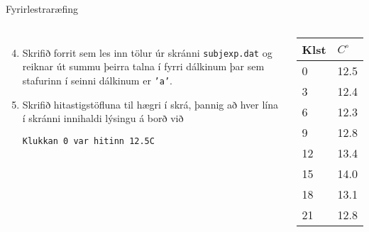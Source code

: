 \documentclass{beamer}
\begin{document}
\begin{frame}[fragile]{Fyrirlestraræfing}
\begin{columns}
\begin{enumerate}
 \setcounter{enumi}{3}
 \item Skrifið forrit sem les inn tölur úr skránni \texttt{subjexp.dat} og reiknar út summu þeirra talna í fyrri dálkinum þar sem stafurinn í seinni dálkinum er \texttt{'a'}.
 \item Skrifið hitastigstöfluna til hægri í skrá, þannig að hver lína í skránni innihaldi lýsingu á borð við
\begin{verbatim}
Klukkan 0 var hitinn 12.5C
\end{verbatim}
\end{enumerate}
\begin{center}
\begin{tabular}{ll}
\toprule
Klst&$C^\circ$\\
\midrule
0&12.5\\
3&12.4\\
6&12.3\\
9&12.8\\
12&13.4\\
15&14.0\\
18&13.1\\
21&12.8\\
\bottomrule
\end{tabular}
\end{center}
\end{columns}
\end{frame}
\end{document}
